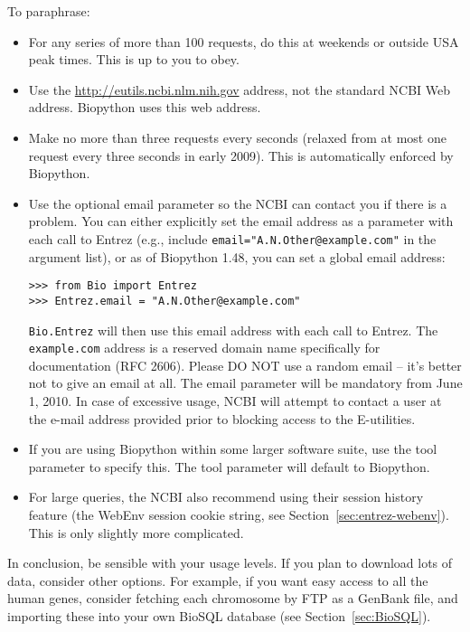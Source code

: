 \documentclass{report}
\begin{document}
To paraphrase:

\begin{itemize}
\item For any series of more than 100 requests, do this at weekends or outside USA peak times.  This is up to you to obey.
\item Use the \url{http://eutils.ncbi.nlm.nih.gov} address, not the standard NCBI Web address.  Biopython uses this web address.
\item Make no more than three requests every seconds (relaxed from at most one request every three seconds in early 2009).  This is automatically enforced by Biopython.
\item Use the optional email parameter so the NCBI can contact you if there is a problem.  You can either explicitly set the email address as a parameter with each call to Entrez (e.g., include {\tt email="A.N.Other@example.com"} in the argument list), or as of Biopython 1.48, you can set a global email address:
\begin{verbatim}
>>> from Bio import Entrez
>>> Entrez.email = "A.N.Other@example.com"
\end{verbatim}
{\tt Bio.Entrez} will then use this email address with each call to Entrez.  The {\tt example.com} address is a reserved domain name specifically for documentation (RFC 2606).  Please DO NOT use a random email -- it's better not to give an email at all. The email parameter will be mandatory from June 1, 2010. In case of excessive usage, NCBI will attempt to contact a user at the e-mail address provided prior to blocking access to the E-utilities.
\item If you are using Biopython within some larger software suite, use the tool parameter to specify this.  The tool parameter will default to Biopython.
\item For large queries, the NCBI also recommend using their session history feature (the WebEnv session cookie string, see Section~\ref{sec:entrez-webenv}).  This is only slightly more complicated.
\end{itemize}

In conclusion, be sensible with your usage levels.  If you plan to download lots of data, consider other options.  For example, if you want easy access to all the human genes, consider fetching each chromosome by FTP as a GenBank file, and importing these into your own BioSQL database (see Section~\ref{sec:BioSQL}).
\end{document}
